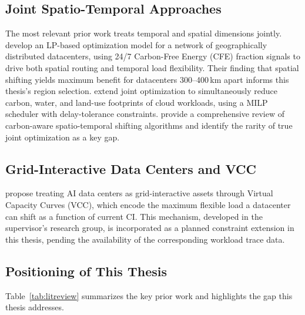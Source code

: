 \subsection{Joint Spatio-Temporal Approaches}

The most relevant prior work treats temporal and spatial dimensions jointly.
\citet{riepin2024spatiotemporal} develop an LP-based optimization model for a network of geographically distributed datacenters, using 24/7 Carbon-Free Energy (CFE) fraction signals to drive both spatial routing and temporal load flexibility.
Their finding that spatial shifting yields maximum benefit for datacenters 300--400\,km apart informs this thesis's region selection.
\citet{attenni2024shifting} extend joint optimization to simultaneously reduce carbon, water, and land-use footprints of cloud workloads, using a MILP scheduler with delay-tolerance constraints.
\citet{asadov2025review} provide a comprehensive review of carbon-aware spatio-temporal shifting algorithms and identify the rarity of true joint optimization as a key gap.

\subsection{Grid-Interactive Data Centers and VCC}

\citet{colangelo2025} propose treating AI data centers as grid-interactive assets through Virtual Capacity Curves (VCC), which encode the maximum flexible load a datacenter can shift as a function of current CI.
This mechanism, developed in the supervisor's research group, is incorporated as a planned constraint extension in this thesis, pending the availability of the corresponding workload trace data.

\subsection{Positioning of This Thesis}

Table~\ref{tab:litreview} summarizes the key prior work and highlights the gap this thesis addresses.

